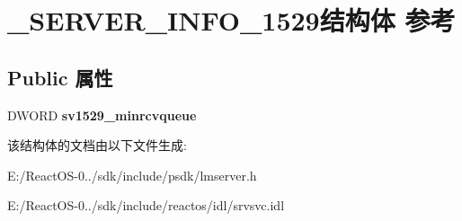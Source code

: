 \hypertarget{struct___s_e_r_v_e_r___i_n_f_o__1529}{}\section{\+\_\+\+S\+E\+R\+V\+E\+R\+\_\+\+I\+N\+F\+O\+\_\+1529结构体 参考}
\label{struct___s_e_r_v_e_r___i_n_f_o__1529}
\subsection*{Public 属性}
\begin{DoxyCompactItemize}
\item 
\mbox{\label{struct___s_e_r_v_e_r___i_n_f_o__1529_a86008002836239ea0446fac62902ba77}} 
D\+W\+O\+RD {\bfseries sv1529\+\_\+minrcvqueue}
\end{DoxyCompactItemize}


该结构体的文档由以下文件生成\+:\begin{DoxyCompactItemize}
\item 
E\+:/\+React\+O\+S-\/0../sdk/include/psdk/lmserver.\+h\item 
E\+:/\+React\+O\+S-\/0../sdk/include/reactos/idl/srvsvc.\+idl\end{DoxyCompactItemize}
